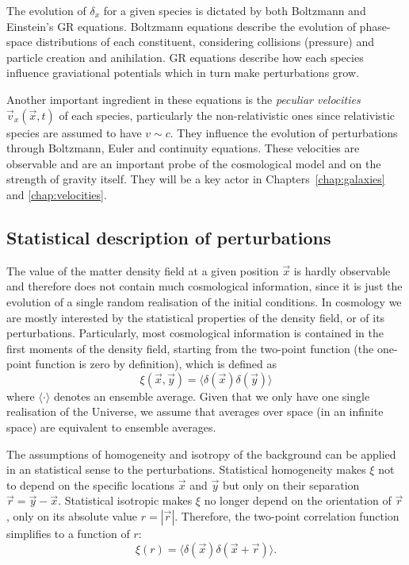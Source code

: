     The evolution of $\delta_x$ for a given species is dictated by both 
    Boltzmann and Einstein's GR equations. Boltzmann equations describe 
    the evolution of phase-space distributions of each constituent, considering
    collisions (pressure) and particle creation and anihilation. GR equations
    describe how each species influence graviational potentials which in turn 
    make perturbations grow.

    Another important ingredient in these equations is the 
    \emph{peculiar velocities} $\vec{v}_x(\vec{x}, t)$ of 
    each species, particularly the non-relativistic ones since 
    relativistic species are assumed to have $v \sim c$. 
    They influence the evolution of perturbations through Boltzmann, Euler
    and continuity equations. These velocities are observable and are an 
    important probe of the cosmological model and on the strength of 
    gravity itself. They will be a key actor in Chapters~\ref{chap:galaxies} and 
    \ref{chap:velocities}. 
    
    \subsection{Statistical description of perturbations}

    The value of the matter density field at a given position $\vec{x}$ is 
    hardly observable and therefore does not contain much cosmological 
    information, since it is just the evolution of a single random 
    realisation of the initial conditions. In cosmology we are mostly 
    interested by the statistical properties of the density field, or 
    of its perturbations. Particularly, most cosmological information is
    contained in the first moments of the density field, starting from the
    two-point function (the one-point function is zero by definition),
    which is defined as
    \begin{equation}
        \xi(\vec{x}, \vec{y}) = \langle \delta(\vec{x}) \delta(\vec{y})\rangle 
        \label{eq:two_point_function_config_space}
    \end{equation}
    where $\langle \cdot \rangle$ denotes an ensemble average. Given that
    we only have one single realisation of the Universe, we assume that
    averages over space (in an infinite space) are equivalent to ensemble averages.

    The assumptions of homogeneity and isotropy of the background can be 
    applied in an statistical sense to the perturbations. Statistical 
    homogeneity makes $\xi$ not to depend on the specific locations $\vec{x}$
    and $\vec{y}$ but only on their separation $\vec{r} = \vec{y}-\vec{x}$. 
    Statistical isotropic makes $\xi$ no longer depend on the orientation of
    $\vec{r}$, only on its absolute value $r = |\vec{r}|$. 
    Therefore, the two-point correlation function simplifies to a function of $r$:
    \begin{equation}
        \xi(r) = \langle \delta(\vec{x}) \delta(\vec{x}+\vec{r})\rangle. 
        \label{eq:two_point_function_config_space_iso_homo}
    \end{equation}
    
